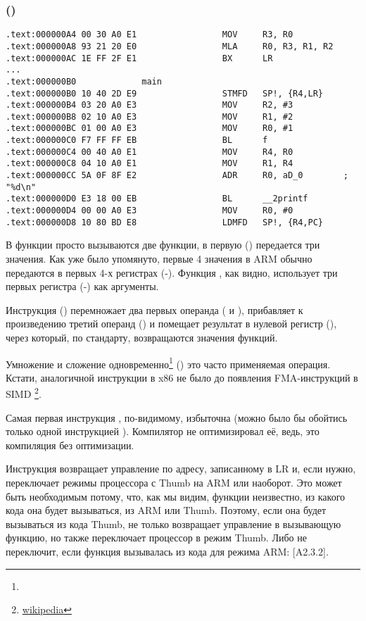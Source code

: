 \subsubsection{\NonOptimizingKeilVI (\ARMMode)}

\begin{lstlisting}
.text:000000A4 00 30 A0 E1                 MOV     R3, R0
.text:000000A8 93 21 20 E0                 MLA     R0, R3, R1, R2
.text:000000AC 1E FF 2F E1                 BX      LR
...
.text:000000B0             main
.text:000000B0 10 40 2D E9                 STMFD   SP!, {R4,LR}
.text:000000B4 03 20 A0 E3                 MOV     R2, #3
.text:000000B8 02 10 A0 E3                 MOV     R1, #2
.text:000000BC 01 00 A0 E3                 MOV     R0, #1
.text:000000C0 F7 FF FF EB                 BL      f
.text:000000C4 00 40 A0 E1                 MOV     R4, R0
.text:000000C8 04 10 A0 E1                 MOV     R1, R4
.text:000000CC 5A 0F 8F E2                 ADR     R0, aD_0        ; "%d\n"
.text:000000D0 E3 18 00 EB                 BL      __2printf
.text:000000D4 00 00 A0 E3                 MOV     R0, #0
.text:000000D8 10 80 BD E8                 LDMFD   SP!, {R4,PC}
\end{lstlisting}

В функции \main просто вызываются две функции, в первую (\ttf) передается три значения.
Как уже было упомянуто, первые 4 значения в ARM обычно передаются в первых 4-х регистрах (-).
Функция \ttf, как видно, использует три первых регистра (-) как аргументы.

Инструкция  () перемножает два первых операнда ( и ), 
прибавляет к произведению
третий операнд () и помещает результат в нулевой регистр (), через который, по стандарту, 
возвращаются значения функций.

Умножение и сложение одновременно\footnote{\WPMAO} 
() это часто применяемая операция. Кстати, аналогичной
инструкции в x86 не было до появления FMA-инструкций в SIMD
\footnote{\href{http://go.yurichev.com/17103}{wikipedia}}.

Самая первая инструкция , по-видимому, избыточна (можно было бы обойтись только одной инструкцией ).
Компилятор не оптимизировал её, ведь, это компиляция без оптимизации.

Инструкция  возвращает управление по адресу, записанному в \ac{LR} и, если нужно, 
переключает режимы процессора с Thumb на ARM или наоборот.
Это может быть необходимым потому, что, как мы видим, 
функции \ttf неизвестно, из какого кода она будет вызываться, из ARM или Thumb.
Поэтому, если она будет вызываться из кода Thumb,  не только возвращает
управление в вызывающую функцию, но также переключает процессор в режим Thumb.
Либо не переключит, если функция вызывалась из кода для режима ARM: [\ARMSevenRef A2.3.2].

